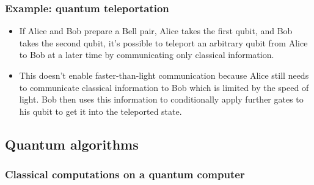 \documentclass{article}
\begin{document}
\subsubsection{Example: quantum teleportation}

\begin{itemize}
  \item If Alice and Bob prepare a Bell pair, Alice takes the first qubit, and Bob takes the second qubit, it's possible to teleport an arbitrary qubit from Alice to Bob at a later time by communicating only classical information.

  \item This doesn't enable faster-than-light communication because Alice still needs to communicate classical information to Bob which is limited by the speed of light. Bob then uses this information to conditionally apply further gates to his qubit to get it into the teleported state.
\end{itemize}

\subsection{Quantum algorithms}

\subsubsection{Classical computations on a quantum computer}
\end{document}
